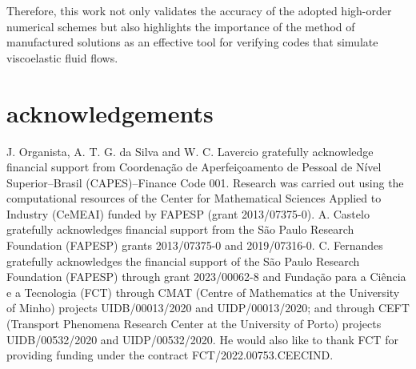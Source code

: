\documentclass[preprint, 12pt]{elsarticle}
\begin{document}
Therefore, this work not only validates the accuracy of the adopted high-order numerical schemes but also highlights the importance of the method of manufactured solutions as an effective tool for verifying codes that simulate viscoelastic fluid flows.



\section*{acknowledgements}
J. Organista, A. T. G. da Silva and W. C. Lavercio gratefully acknowledge financial support from Coordenação de Aperfeiçoamento de Pessoal de Nível Superior–Brasil (CAPES)–Finance Code 001. Research was carried out using the computational resources of the Center for Mathematical Sciences Applied to Industry (CeMEAI) funded by FAPESP (grant 2013/07375-0). A. Castelo gratefully acknowledges financial support from the São Paulo Research Foundation (FAPESP) grants 2013/07375-0 and 2019/07316-0. C. Fernandes gratefully acknowledges the financial support of the São Paulo Research Foundation (FAPESP) through grant 2023/00062-8 and Fundação para a Ciência e a Tecnologia (FCT) through CMAT (Centre of Mathematics at the University of Minho) projects UIDB/00013/2020 and UIDP/00013/2020; and through CEFT (Transport Phenomena Research Center at the University of Porto) projects UIDB/00532/2020 and UIDP/00532/2020. He would also like to thank FCT for providing funding under the contract FCT/2022.00753.CEECIND.

% 

% 
\end{document}
